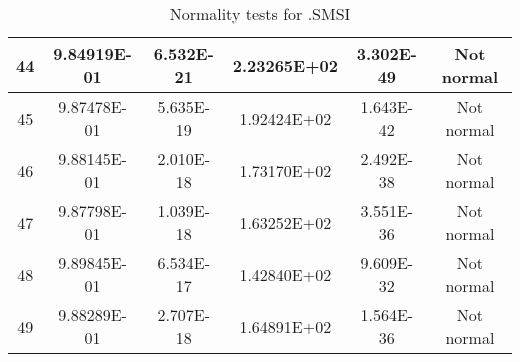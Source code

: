 \begin{table}[h]
\begin{tabular}{|c|c|c|c|c|c|}
		44 & 9.84919E-01 & 6.532E-21 & 2.23265E+02 & 3.302E-49 & Not normal\\\hline
		45 & 9.87478E-01 & 5.635E-19 & 1.92424E+02 & 1.643E-42 & Not normal\\\hline
		46 & 9.88145E-01 & 2.010E-18 & 1.73170E+02 & 2.492E-38 & Not normal\\\hline
		47 & 9.87798E-01 & 1.039E-18 & 1.63252E+02 & 3.551E-36 & Not normal\\\hline
		48 & 9.89845E-01 & 6.534E-17 & 1.42840E+02 & 9.609E-32 & Not normal\\\hline
		49 & 9.88289E-01 & 2.707E-18 & 1.64891E+02 & 1.564E-36 & Not normal\\\hline
	\end{tabular}
	\caption{Normality tests for .SMSI}
\end{table}
